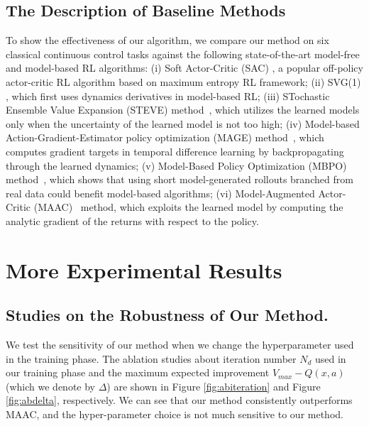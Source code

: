 \documentclass{article} %
\newcommand{\vmax}{V_{max}}
\newcommand{\lijun}[1]{ {#1}}
\newcommand{\revision}[1]{{#1}}
\begin{document}
\revision{
\subsection{The Description of Baseline Methods}\label{sec:des_baseline}
To show the effectiveness of our algorithm, we compare our method on six classical continuous control tasks against the following state-of-the-art model-free and model-based RL algorithms:
(i) Soft Actor-Critic (SAC) \citep{haarnoja2018soft}, a popular off-policy actor-critic RL algorithm based on maximum entropy RL framework; (ii) SVG(1) \citep{heess2015learning}, which first uses dynamics derivatives in model-based RL; (iii) STochastic Ensemble Value Expansion (STEVE) method~\citep{buckman2018sample}, which utilizes the learned 
models only when the uncertainty of the learned model is not too high; (iv) Model-based Action-Gradient-Estimator policy optimization (MAGE) method~\citep{d2020learn}, which computes gradient targets in temporal difference learning by backpropagating through the learned dynamics; (v) Model-Based Policy Optimization (MBPO) method~\citep{janner_when_2019}, which shows that using short model-generated rollouts branched from real data could benefit model-based algorithms; (vi) Model-Augmented Actor-Critic (MAAC)~\citep{clavera_model-augmented_2019} method, which exploits the learned model by computing the analytic gradient of the returns with respect to the policy. }


\section{More Experimental Results}
\subsection{Studies on the Robustness of Our Method.}
\label{sec_study_hyper}
We test the sensitivity of our method when we change the hyperparameter used in the training phase. The ablation studies about iteration number $N_d$ used in our training phase and the \lijun{maximum expected improvement $\vmax - Q(x,a)$ (which we denote by $\Delta$)} are shown in Figure \ref{fig:abiteration} and Figure \ref{fig:abdelta}, respectively. We can see that our method consistently outperforms MAAC, and the hyper-parameter choice is not much sensitive to our method. 
\end{document}
